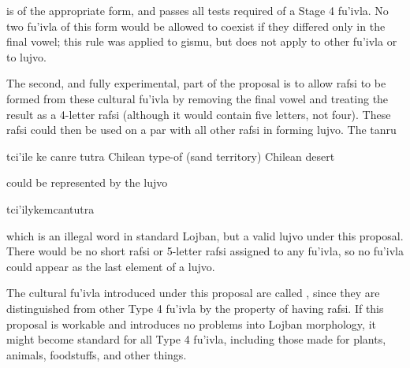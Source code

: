 {\noindent}is of the appropriate form, and passes all tests required of a Stage 4 fu'ivla. No two fu'ivla of this form would be allowed to coexist if they differed only in the final vowel; this rule was applied to gismu, but does not apply to other fu'ivla or to lujvo. 

The second, and fully experimental, part of the proposal is to allow rafsi to be formed from these cultural fu'ivla by removing the final vowel and treating the result as a 4-letter rafsi (although it would contain five letters, not four). These rafsi could then be used on a par with all other rafsi in forming lujvo. The tanru
\begin{example}
tci'ile ke canre tutra\n
Chilean type-of (sand territory)\n
Chilean desert
\end{example}

{\noindent}could be represented by the lujvo
\begin{example}
tci'ilykemcantutra
\end{example}

{\noindent}which is an illegal word in standard Lojban, but a valid lujvo under this proposal. There would be no short rafsi or 5-letter rafsi assigned to any fu'ivla, so no fu'ivla could appear as the last element of a lujvo. 

The cultural fu'ivla introduced under this proposal are called , since they are distinguished from other Type 4 fu'ivla by the property of having rafsi. If this proposal is workable and introduces no problems into Lojban morphology, it might become standard for all Type 4 fu'ivla, including those made for plants, animals, foodstuffs, and other things.
